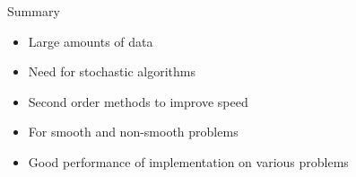 \documentclass[10pt]{beamer}
\begin{document}
  \begin{frame}{Summary}
    \begin{itemize}
    	\item Large amounts of data
    	\item Need for stochastic algorithms
    	\item Second order methods to improve speed
    	\item For smooth and non-smooth problems
    	\item Good performance of implementation on various problems
    \end{itemize}
  \end{frame}


  \begin{frame}[allowframebreaks]


    {\footnotesize{
    
    
    }
    }

  \end{frame}
\end{document}
